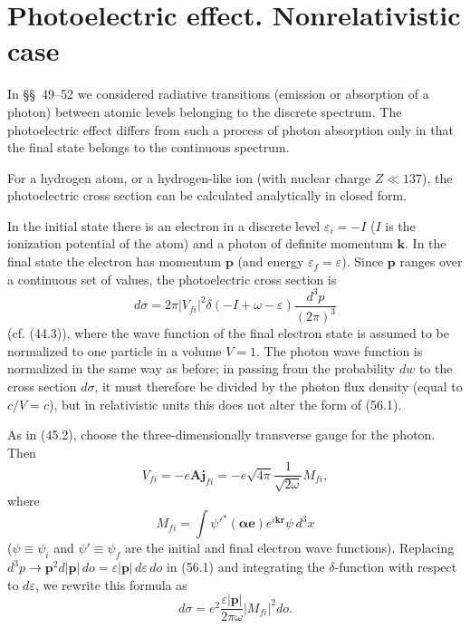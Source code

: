 \section{Photoelectric effect. Nonrelativistic case}

In \S\S~49--52 we considered radiative transitions (emission or absorption of a photon) between atomic levels belonging to the discrete spectrum. The photoelectric effect differs from such a process of%
photon absorption only in that the final state belongs to the continuous spectrum.

For a hydrogen atom, or a hydrogen-like ion (with nuclear charge $Z\ll137$), the photoelectric cross section can be calculated analytically in closed form.

In the initial state there is an electron in a discrete level $\varepsilon_i=-I$ ($I$ is the ionization potential of the atom) and a photon of definite momentum $\mathbf k$. In the final state the electron has momentum $\mathbf p$ (and energy $\varepsilon_f=\varepsilon$). Since $\mathbf p$ ranges over a continuous set of values, the photoelectric cross section is
\begin{equation}
d\sigma=2\pi|V_{fi}|^2\delta(-I+\omega-\varepsilon)\frac{d^3p}{(2\pi)^3}
\tag{56.1}
\end{equation}
(cf. (44.3)), where the wave function of the final electron state is assumed to be normalized to one particle in a volume $V=1$. The photon wave function is normalized in the same way as before; in passing from the probability $dw$ to the cross section $d\sigma$, it must therefore be divided by the photon flux density (equal to $c/V=c$), but in relativistic units this does not alter the form of (56.1).

As in (45.2), choose the three-dimensionally transverse gauge for the photon. Then
\[
V_{fi}=-e\mathbf A\mathbf j_{fi}
=-e\sqrt{4\pi}\frac1{\sqrt{2\omega}}M_{fi},
\]
where
\begin{equation}
M_{fi}=\int\psi'^*(\boldsymbol\alpha\mathbf e)e^{i\mathbf k\mathbf r}\psi\,d^3x
\tag{56.2}
\end{equation}
($\psi\equiv\psi_i$ and $\psi'\equiv\psi_f$ are the initial and final electron wave functions). Replacing $d^3p\to\mathbf p^2d|\mathbf p|\,do=\varepsilon|\mathbf p|\,d\varepsilon\,do$ in (56.1) and integrating the $\delta$-function with respect to $d\varepsilon$, we rewrite this formula as
\begin{equation}
d\sigma=e^2\frac{\varepsilon|\mathbf p|}{2\pi\omega}|M_{fi}|^2do.
\tag{56.3}
\end{equation}

